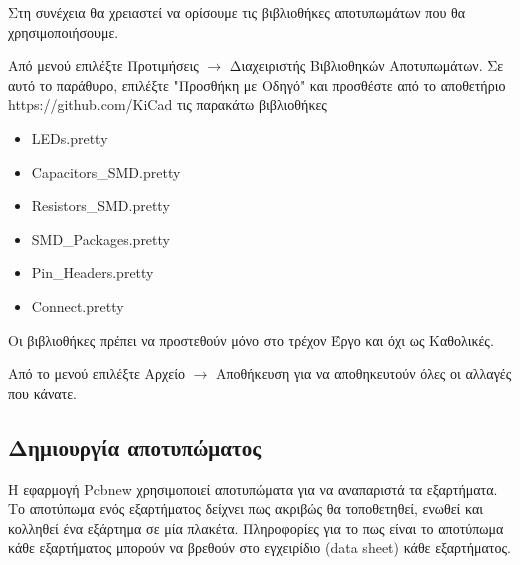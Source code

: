 \documentclass[a4paper]{article}
\begin{document}

Στη συνέχεια θα χρειαστεί να ορίσουμε τις βιβλιοθήκες αποτυπωμάτων που θα χρησιμοποιήσουμε. 

Από μενού επιλέξτε Προτιμήσεις $\rightarrow$ Διαχειριστής Βιβλιοθηκών Αποτυπωμάτων. Σε αυτό το παράθυρο, επιλέξτε "Προσθήκη με Οδηγό" και προσθέστε από το αποθετήριο https://github.com/KiCad τις παρακάτω βιβλιοθήκες 

\begin{itemize}
    \item \textenglish{LED}s.pretty
    \item Capacitors\_SMD.pretty
    \item Resistors\_SMD.pretty
    \item SMD\_Packages.pretty
    \item Pin\_Headers.pretty
    \item Connect.pretty
\end{itemize}

Οι βιβλιοθήκες πρέπει να προστεθούν μόνο στο τρέχον Έργο και όχι ως Καθολικές.

\begin{figure}
  \begin{center}
    \label{fig:kicad-main}
  \end{center}
\end{figure}

\begin{figure}
  \begin{center}
    \label{fig:kicad-main}
  \end{center}
\end{figure}


Από το μενού επιλέξτε Αρχείο $\rightarrow$ Αποθήκευση για να αποθηκευτούν όλες οι αλλαγές που κάνατε.


\subsection{Δημιουργία αποτυπώματος}
Η εφαρμογή \textenglish{Pcbnew} χρησιμοποιεί αποτυπώματα για να αναπαριστά τα εξαρτήματα. Το αποτύπωμα ενός εξαρτήματος δείχνει πως ακριβώς θα τοποθετηθεί, ενωθεί και κολληθεί ένα εξάρτημα σε μία πλακέτα. Πληροφορίες για το πως είναι το αποτύπωμα κάθε εξαρτήματος μπορούν να βρεθούν στο εγχειρίδιο (data sheet) κάθε εξαρτήματος. 
\end{document}
